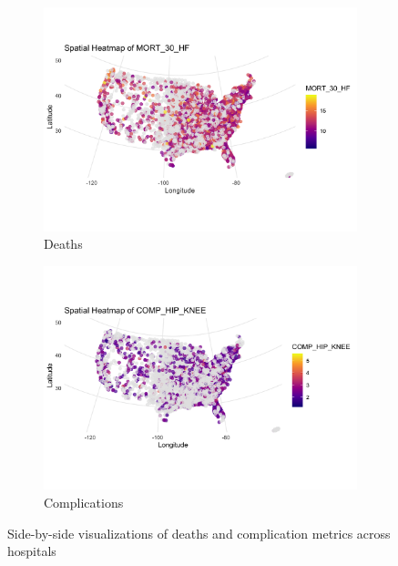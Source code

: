 \documentclass[10pt]{article}
\begin{document}
\begin{figure}[htbp]
  \centering
  \begin{subfigure}[b]{0.45\linewidth}
    \centering
    \includegraphics[width=\linewidth]{../data-folder/medicare-and-medicaid-metrics/quality-measure-2022/hospitals-10-2022/complications-and-deaths/complications-and-deaths_files/figure-html/unnamed-chunk-4-4}
    \caption{Deaths}
    \label{fig:complications}
  \end{subfigure}
  \hspace{1em}
  \begin{subfigure}[b]{0.45\linewidth}
    \centering
    \includegraphics[width=\linewidth]{../data-folder/medicare-and-medicaid-metrics/quality-measure-2022/hospitals-10-2022/complications-and-deaths/complications-and-deaths_files/figure-html/unnamed-chunk-4-7}
    \caption{Complications}
    \label{fig:deaths}
  \end{subfigure}
  \caption{Side-by-side visualizations of deaths and complication metrics across hospitals}
  \label{fig:complications-deaths}
\end{figure}
\end{document}
